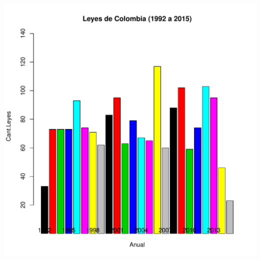 \documentclass[conference]{IEEEtran}\usepackage[]{graphicx}\usepackage[]{color}
\makeatletter
\def\maxwidth{ %
  \ifdim\Gin@nat@width>\linewidth
    \linewidth
  \else
    \Gin@nat@width
  \fi
}
\newenvironment{knitrout}{}{} %
\makeatother
\begin{document}
\begin{knitrout}
\color{fgcolor}
\includegraphics[width=\maxwidth]{figure/unnamed-chunk-3-1} 

\end{knitrout}
			
	
			
\end{document}
